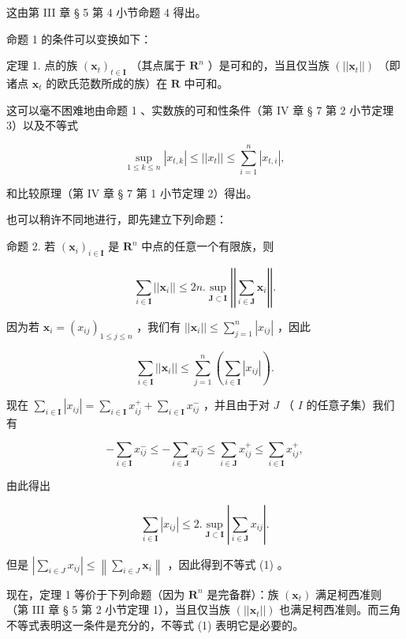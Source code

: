 这由第 III 章 § 5 第 4 小节命题 4 得出。

命题 1 的条件可以变换如下：

定理 1. 点的族 \((\pmb{x}_t)_{t\in \mathbf{I}}\) （其点属于 \(\mathbf{R}^n\) ）是可和的，当且仅当族 \((||\pmb{x}_t||)\) （即诸点 \(\pmb{x}_t\) 的欧氏范数所成的族）在 \(\mathbf{R}\) 中可和。

这可以毫不困难地由命题 1 、实数族的可和性条件（第 IV 章 § 7 第 2 小节定理 3）以及不等式

\[
\sup _ {1 \leqslant k \leqslant n} | x _ {t, k} | \leqslant | | x _ {t} | | \leqslant \sum_ {i = 1} ^ {n} | x _ {t, i} |,
\]

和比较原理（第 IV 章 § 7 第 1 小节定理 2）得出。

也可以稍许不同地进行，即先建立下列命题：

命题 2. 若 \((\pmb{x}_i)_{i\in \mathbf{I}}\) 是 \(\mathbf{R}^n\) 中点的任意一个有限族，则

\[
\sum_ {i \in \mathbf {I}} | | \boldsymbol {x} _ {i} | | \leqslant 2 n. \sup _ {\mathbf {J} \subset \mathbf {I}} \left| \left| \sum_ {i \in \mathbf {J}} \boldsymbol {x} _ {i} \right| \right|.\tag{1}
\]

因为若 \(\pmb{x}_i = (x_{ij})_{1\leqslant j\leqslant n}\) ，我们有 \(||\pmb{x}_i|| \leqslant \sum_{j=1}^{n} |x_{ij}|\) ，因此

\[
\sum_ {i \in \mathbf {I}} | | \boldsymbol {x} _ {i} | | \leqslant \sum_ {j = 1} ^ {n} \left(\sum_ {i \in \mathbf {I}} | x _ {i j} |\right).
\]

现在 \(\sum_{i\in \mathbf{I}}|x_{ij}| = \sum_{i\in \mathbf{I}}x_{ij}^{+} + \sum_{i\in \mathbf{I}}x_{ij}^{-}\) ，并且由于对 \(J\) （ \(I\) 的任意子集）我们有

\[
- \sum_ {i \in \mathbf {I}} x _ {i j} ^ {-} \leqslant - \sum_ {i \in \mathbf {J}} x _ {i j} ^ {-} \leqslant \sum_ {i \in \mathbf {J}} x _ {i j} ^ {+} \leqslant \sum_ {i \in \mathbf {I}} x _ {i j} ^ {+},
\]

由此得出

\[
\sum_ {i \in \mathbf {I}} | x _ {i j} | \leqslant 2. \sup _ {\mathbf {J} \subset \mathbf {I}} \left| \sum_ {i \in \mathbf {J}} x _ {i j} \right|.
\]

但是 \(\left|\sum_{i\in J}x_{ij}\right| \leqslant \left\| \sum_{i\in J}\boldsymbol{x}_i\right\|\) ，因此得到不等式 (1) 。

现在，定理 1 等价于下列命题（因为 \(\mathbf{R}^n\) 是完备群）：族 \((\pmb{x}_t)\) 满足柯西准则（第 III 章 § 5 第 2 小节定理 1），当且仅当族 \((||\pmb{x}_t||)\) 也满足柯西准则。而三角不等式表明这一条件是充分的，不等式 (1) 表明它是必要的。

